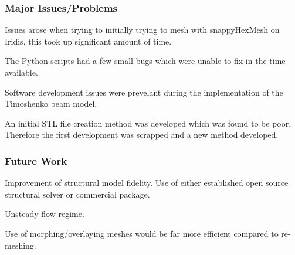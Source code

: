 \documentclass{beamer}
\begin{document}
\begin{frame}
	\frametitle{Major Issues/Problems}
	Issues arose when trying to initially trying to mesh with snappyHexMesh on Iridis, this took up significant amount of time.
	
	The Python scripts had a few small bugs which were unable to fix in the time available.
	
	Software development issues were prevelant during the implementation of the Timoshenko beam model.
	
	An initial STL file creation method was developed which was found to be poor. Therefore the first development was scrapped and a new method developed. 
\end{frame}

\begin{frame}
	\frametitle{Future Work}
	Improvement of structural model fidelity. Use of either established open source structural solver or commercial package.
	
	Unsteady flow regime.
	
	Use of morphing/overlaying meshes would be far more efficient compared to re-meshing.
	
\end{frame}
\end{document}
